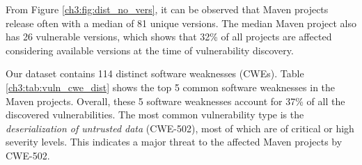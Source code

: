 From Figure \ref{ch3:fig:dist_no_vers}, it can be observed that Maven projects release often with a median of 81 unique versions.
The median Maven project also has 26 vulnerable versions, which shows that 32\% of all projects are affected considering available versions at the time of vulnerability discovery.

Our dataset contains 114 distinct software weaknesses (CWEs). Table \ref{ch3:tab:vuln_cwe_dist} shows the top 5 common software weaknesses in the Maven projects. Overall, these 5 software weaknesses account for 37\% of all the discovered vulnerabilities.
The most common vulnerability type is the \emph{deserialization of untrusted data} (CWE-502), most of which are of critical or high severity levels. This indicates a major threat to the affected Maven projects by CWE-502.

